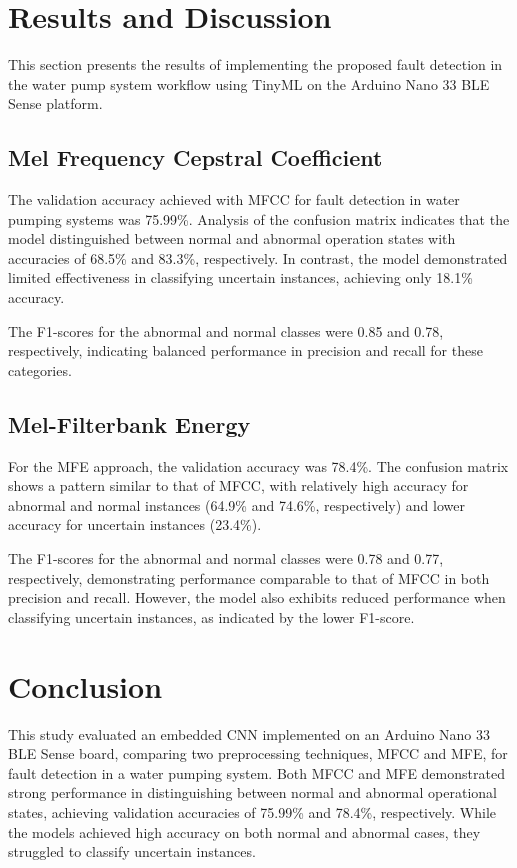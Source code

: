 \section{Results and Discussion}
\label{sec:results}

This section presents the results of implementing the proposed fault detection in the water pump system workflow using TinyML on the Arduino Nano 33 BLE Sense platform.

\subsection{Mel Frequency Cepstral Coefficient}

The validation accuracy achieved with MFCC for fault detection in water pumping systems was 75.99\%. Analysis of the confusion matrix indicates that the model distinguished between normal and abnormal operation states with accuracies of 68.5\% and 83.3\%, respectively. In contrast, the model demonstrated limited effectiveness in classifying uncertain instances, achieving only 18.1\% accuracy.

The F1-scores for the abnormal and normal classes were 0.85 and 0.78, respectively, indicating balanced performance in precision and recall for these categories.

\subsection{Mel-Filterbank Energy}

For the MFE approach, the validation accuracy was 78.4\%. The confusion matrix shows a pattern similar to that of MFCC, with relatively high accuracy for abnormal and normal instances (64.9\% and 74.6\%, respectively) and lower accuracy for uncertain instances (23.4\%).

The F1-scores for the abnormal and normal classes were 0.78 and 0.77, respectively, demonstrating performance comparable to that of MFCC in both precision and recall. However, the model also exhibits reduced performance when classifying uncertain instances, as indicated by the lower F1-score.

\section{Conclusion}\label{sec:conclusion}

This study evaluated an embedded CNN implemented on an Arduino Nano 33 BLE Sense board, comparing two preprocessing techniques, MFCC and MFE, for fault detection in a water pumping system. Both MFCC and MFE demonstrated strong performance in distinguishing between normal and abnormal operational states, achieving validation accuracies of 75.99\% and 78.4\%, respectively. While the models achieved high accuracy on both normal and abnormal cases, they struggled to classify uncertain instances.
